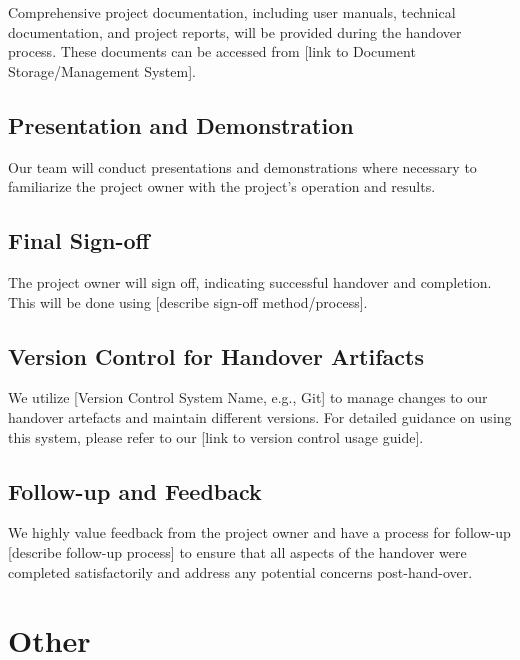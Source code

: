 \documentclass[10pt]{projectdoc}
\begin{document}
Comprehensive project documentation, including user manuals, technical documentation, and project reports, will be provided during the handover process. These documents can be accessed from [link to Document Storage/Management System].

\subsection{Presentation and Demonstration}

Our team will conduct presentations and demonstrations where necessary to familiarize the project owner with the project's operation and results.

\subsection{Final Sign-off}

The project owner will sign off, indicating successful handover and completion. This will be done using [describe sign-off method/process].

\subsection{Version Control for Handover Artifacts}

We utilize [Version Control System Name, e.g., Git] to manage changes to our handover artefacts and maintain different versions. For detailed guidance on using this system, please refer to our [link to version control usage guide].

\subsection{Follow-up and Feedback}

We highly value feedback from the project owner and have a process for follow-up [describe follow-up process] to ensure that all aspects of the handover were completed satisfactorily and address any potential concerns post-hand-over.


\newpage
\section{Other}

\end{document}
